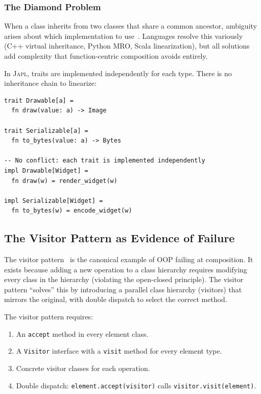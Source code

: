 \documentclass[11pt,a4paper]{article}
\newcommand{\japl}{\textsc{Japl}}
\begin{document}
\subsubsection{The Diamond Problem}

When a class inherits from two classes that share a common ancestor, ambiguity arises about which implementation to use~\citep{sakkinen1989disciplined}. Languages resolve this variously (C++ virtual inheritance, Python MRO, Scala linearization), but all solutions add complexity that function-centric composition avoids entirely.

In \japl{}, traits are implemented independently for each type. There is no inheritance chain to linearize:

\begin{lstlisting}
trait Drawable[a] =
  fn draw(value: a) -> Image

trait Serializable[a] =
  fn to_bytes(value: a) -> Bytes

-- No conflict: each trait is implemented independently
impl Drawable[Widget] =
  fn draw(w) = render_widget(w)

impl Serializable[Widget] =
  fn to_bytes(w) = encode_widget(w)
\end{lstlisting}

\subsection{The Visitor Pattern as Evidence of Failure}

The visitor pattern~\citep{gamma1994design} is the canonical example of OOP failing at composition. It exists because adding a new operation to a class hierarchy requires modifying every class in the hierarchy (violating the open-closed principle). The visitor pattern ``solves'' this by introducing a parallel class hierarchy (visitors) that mirrors the original, with double dispatch to select the correct method.

The visitor pattern requires:
\begin{enumerate}
  \item An \texttt{accept} method in every element class.
  \item A \texttt{Visitor} interface with a \texttt{visit} method for every element type.
  \item Concrete visitor classes for each operation.
  \item Double dispatch: \texttt{element.accept(visitor)} calls \texttt{visitor.visit(element)}.
\end{enumerate}
\end{document}
